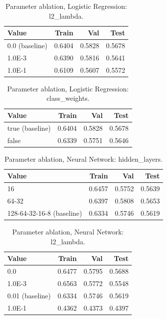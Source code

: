 \begin{table}[ht]
\centering
\small
\caption{Parameter ablation, Logistic Regression: l2\_lambda.}
\label{tab:ablation-logistic-l2-lambda}
\begin{tabular}{lrrr}
\toprule
Value & Train & Val & Test \\
\midrule
0.0 (baseline) & 0.6404 & 0.5828 & 0.5678 \\
1.0E-3 & 0.6390 & 0.5816 & 0.5641 \\
1.0E-1 & 0.6109 & 0.5607 & 0.5572 \\
\bottomrule
\end{tabular}
\end{table}

\begin{table}[ht]
\centering
\small
\caption{Parameter ablation, Logistic Regression: class\_weights.}
\label{tab:ablation-logistic-class-weights}
\begin{tabular}{lrrr}
\toprule
Value & Train & Val & Test \\
\midrule
true (baseline) & 0.6404 & 0.5828 & 0.5678 \\
false & 0.6339 & 0.5751 & 0.5646 \\
\bottomrule
\end{tabular}
\end{table}

\begin{table}[ht]
\centering
\small
\caption{Parameter ablation, Neural Network: hidden\_layers.}
\label{tab:ablation-neural-hidden-layers}
\begin{tabular}{lrrr}
\toprule
Value & Train & Val & Test \\
\midrule
16 & 0.6457 & 0.5752 & 0.5639 \\
64-32 & 0.6397 & 0.5808 & 0.5653 \\
128-64-32-16-8 (baseline) & 0.6334 & 0.5746 & 0.5619 \\
\bottomrule
\end{tabular}
\end{table}

\begin{table}[ht]
\centering
\small
\caption{Parameter ablation, Neural Network: l2\_lambda.}
\label{tab:ablation-neural-l2-lambda}
\begin{tabular}{lrrr}
\toprule
Value & Train & Val & Test \\
\midrule
0.0 & 0.6477 & 0.5795 & 0.5688 \\
1.0E-3 & 0.6563 & 0.5772 & 0.5548 \\
0.01 (baseline) & 0.6334 & 0.5746 & 0.5619 \\
1.0E-1 & 0.4362 & 0.4373 & 0.4397 \\
\bottomrule
\end{tabular}
\end{table}

